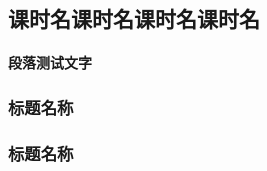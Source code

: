\documentclass[color=blue]{textbook-cn}%
\begin{document}
\begin{Paracol}
\subsection{课时名课时名课时名课时名}
\paragraph{段落测试文字}
\lipsum[3]

\subsubsection{标题名称}
\lipsum[1]

\begin{History}
\lipsum[1-2]
\end{History}



\begin{STS}
\lipsum[1-2]
\end{STS}



\begin{Information}
\lipsum[2]
\end{Information}


\subsubsection{标题名称}


\lipsum[1]

\end{Paracol}


\begin{Application}
\lipsum[2][1-3]
\end{Application}

\begin{Link}
\lipsum[2][1-3]
\end{Link}

\begin{Lemma}[万有引力定律]
\lipsum[2][1-3]
\end{Lemma}



\begin{Theorem}[动量定理]
\lipsum[2][1-3]
\end{Theorem}


\begin{Warning}
\lipsum[2][1-3]
\end{Warning}

\begin{Mind}[控制变量]
\lipsum[2][1-3]
\end{Mind}
\end{document}
